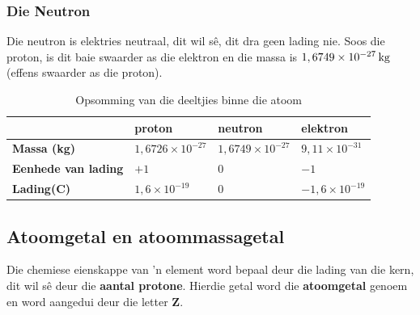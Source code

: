 \subsubsection*{Die Neutron}
\nopagebreak
\label{m38745*id254468}
Die neutron is elektries neutraal, dit wil s\^{e}, dit dra geen lading nie. Soos die proton, is dit baie swaarder as die elektron en die massa is $1,6749\ensuremath{\times}{10}^{-27}\phantom{\rule{2pt}{0ex}}\text{kg}$ (effens swaarder as die proton).\par 
\label{m38745*notfhsst!!!underscore!!!id214}
          \begin{table}[H]
        \begin{center}
      \label{m38745*uid14}
    \noindent
      \begin{tabular}{|l|l|l|l|}\hline
         &
                    \textbf{proton}
                   &
                    \textbf{neutron}
                   &
                    \textbf{elektron} \\ \hline
                    \textbf{Massa (kg)}
                   &
        $1,6726\ensuremath{\times}{10}^{-27}$ &
        $1,6749\ensuremath{\times}{10}^{-27}$ &
        $9,11\ensuremath{\times}{10}^{-31}$ \\ \hline
                    \textbf{Eenhede van lading}
                   &
        $+1$ &
        $0$ &
        $-1$ \\ \hline
                    \textbf{Lading(C)}
                   &
        $1,6 \times {10}^{-19}$ &
        $0$ &
        $-1,6 \times {10}^{-19}$ \\ \hline
    \end{tabular}
      \end{center}
    \caption{Opsomming van die deeltjies binne die atoom}
\end{table}
    
\subsection*{Atoomgetal en atoommassagetal}
\nopagebreak
\label{m38745*id255805}
Die chemiese eienskappe van 'n element word bepaal deur die lading van die kern, dit wil sê deur die \textbf{aantal protone}. Hierdie getal word die \textbf{atoomgetal} genoem en word aangedui deur die letter \textbf{Z}.\par 



